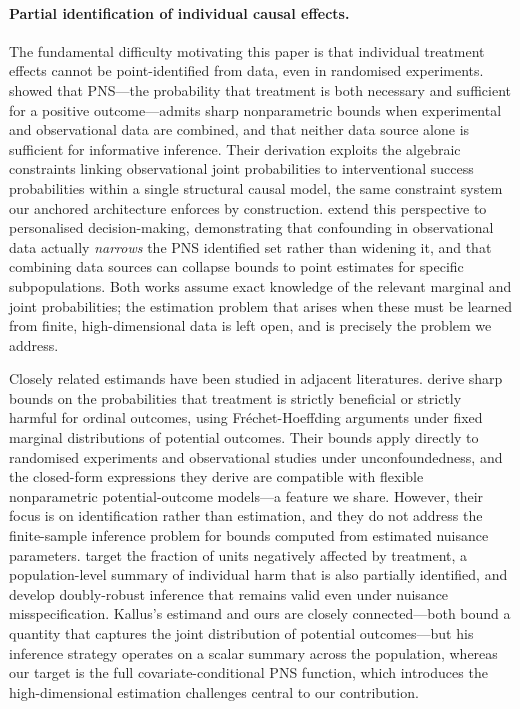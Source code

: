 \documentclass[accepted]{uai2026} %
\theoremstyle{plain}
\theoremstyle{definition}
\theoremstyle{remark}
\begin{document}
\paragraph{Partial identification of individual causal effects.}
The fundamental difficulty motivating this paper is that individual
treatment effects cannot be point-identified from data, even in
randomised experiments. \citet{tian2000probabilities} showed that
PNS---the probability that treatment is both necessary and sufficient
for a positive outcome---admits sharp nonparametric bounds when
experimental and observational data are combined, and that neither data
source alone is sufficient for informative inference. Their derivation
exploits the algebraic constraints linking observational joint
probabilities to interventional success probabilities within a single
structural causal model, the same constraint system our anchored
architecture enforces by construction.
\citet{MuellerPearl2023} extend this perspective to personalised
decision-making, demonstrating that confounding in observational data
actually \emph{narrows} the PNS identified set rather than widening it,
and that combining data sources can collapse bounds to point estimates
for specific subpopulations. Both works assume exact knowledge of the
relevant marginal and joint probabilities; the estimation problem that
arises when these must be learned from finite, high-dimensional data is
left open, and is precisely the problem we address.

Closely related estimands have been studied in adjacent literatures.
\citet{dasgupta2018treatment} derive sharp bounds on the probabilities
that treatment is strictly beneficial or strictly harmful for ordinal
outcomes, using Fréchet-Hoeffding arguments under fixed marginal
distributions of potential outcomes. Their bounds apply directly to
randomised experiments and observational studies under unconfoundedness,
and the closed-form expressions they derive are compatible with flexible
nonparametric potential-outcome models---a feature we share. However,
their focus is on identification rather than estimation, and they do not
address the finite-sample inference problem for bounds computed from
estimated nuisance parameters. \citet{Kallus2022Harm} target the
fraction of units negatively affected by treatment, a population-level
summary of individual harm that is also partially identified, and
develop doubly-robust inference that remains valid even under nuisance
misspecification. Kallus's estimand and ours are closely connected---both
bound a quantity that captures the joint distribution of potential
outcomes---but his inference strategy operates on a scalar summary
across the population, whereas our target is the full covariate-conditional
PNS function, which introduces the high-dimensional estimation challenges
central to our contribution.
\end{document}

